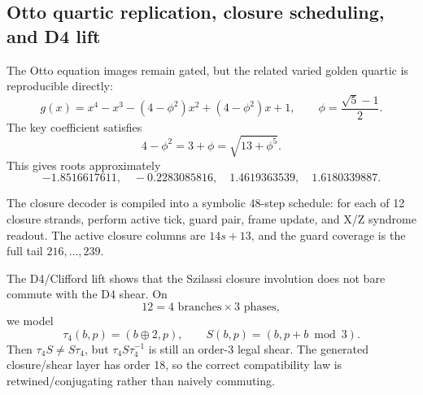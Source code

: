 \subsection{Otto quartic replication, closure scheduling, and D4 lift}
\label{sec:bt1450-bt1452-quartic-schedule-clifford}

The Otto equation images remain gated, but the related varied golden quartic is
reproducible directly:
\[
g(x)=x^4-x^3-(4-\phi^2)x^2+(4-\phi^2)x+1,
\qquad
\phi=\frac{\sqrt5-1}{2}.
\]
The key coefficient satisfies
\[
4-\phi^2=3+\phi=\sqrt{13+\phi^5}.
\]
This gives roots approximately
\[
-1.8516617611,\quad -0.2283085816,\quad 1.4619363539,\quad 1.6180339887.
\]

The closure decoder is compiled into a symbolic 48-step schedule: for each of
12 closure strands, perform active tick, guard pair, frame update, and X/Z
syndrome readout.  The active closure columns are \(14s+13\), and the guard
coverage is the full tail \(216,\ldots,239\).

The D4/Clifford lift shows that the Szilassi closure involution does not bare
commute with the D4 shear.  On
\[
12=4\text{ branches}\times3\text{ phases},
\]
we model
\[
\tau_4(b,p)=(b\oplus2,p),\qquad S(b,p)=(b,p+b\bmod3).
\]
Then \(\tau_4S\ne S\tau_4\), but \(\tau_4S\tau_4^{-1}\) is still an order-3
legal shear.  The generated closure/shear layer has order 18, so the correct
compatibility law is retwined/conjugating rather than naively commuting.
